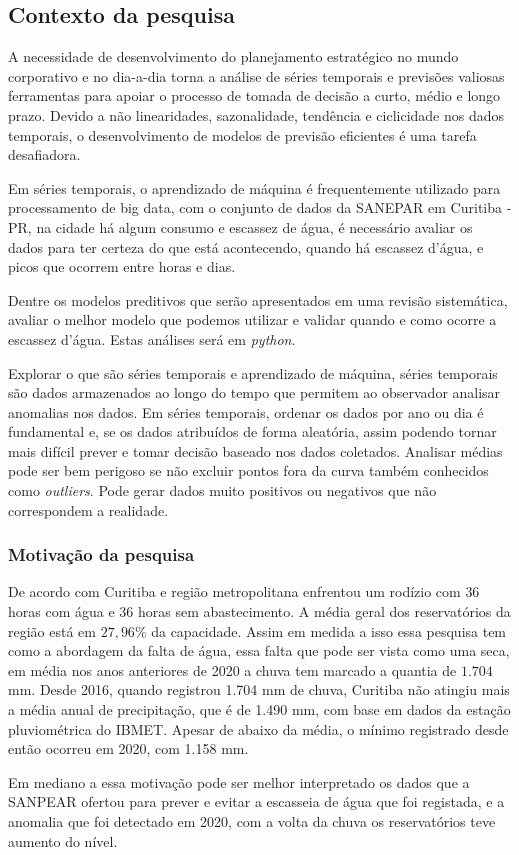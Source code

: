 \subsection{Contexto da pesquisa} \label{subsec:contexto}
 A necessidade de desenvolvimento do planejamento estratégico no mundo corporativo e no dia-a-dia torna a análise de séries temporais e previsões valiosas ferramentas para apoiar o processo de tomada de decisão a curto, médio e longo prazo. Devido a não linearidades, sazonalidade, tendência e ciclicidade nos dados temporais, o desenvolvimento de modelos de previsão eficientes é uma tarefa desafiadora. 

 Em séries temporais, o aprendizado de máquina é frequentemente utilizado para processamento de big data, com o conjunto de dados da SANEPAR em Curitiba - PR, na cidade há algum consumo e escassez de água, é necessário avaliar os dados para ter certeza do que está acontecendo, quando há escassez d'água, e picos que ocorrem entre horas e dias.
 
 Dentre os modelos preditivos que serão apresentados em uma revisão sistemática, avaliar o melhor modelo que podemos utilizar e validar quando e como ocorre a escassez d'água. Estas análises será em \textit{python}.
 
 Explorar o que são séries temporais e aprendizado de máquina, séries temporais são dados armazenados ao longo do tempo que permitem ao observador analisar anomalias nos dados. Em séries temporais, ordenar os dados por ano ou dia é fundamental e, se os dados atribuídos de forma aleatória, assim podendo tornar mais difícil prever e tomar decisão baseado nos dados coletados. 
 Analisar médias pode ser bem perigoso se não excluir pontos fora da curva também conhecidos como \textit{outliers}. Pode gerar dados muito positivos ou negativos que não correspondem a realidade.
   
      
\subsubsection{Motiva\c c\~ao da pesquisa} \label{subsubsec:motivacao}
    
    De acordo com \cite{vasconcelos_2020} Curitiba e região metropolitana enfrentou um rodízio com $36$ horas com água e $36$ horas sem abastecimento. A média geral dos reservatórios da região está em $27,96\%$ da capacidade. Assim em medida a isso essa pesquisa tem como a abordagem da falta de água, essa falta que pode ser vista como uma seca, em média nos anos anteriores de 2020 a chuva tem marcado a quantia de $1.704$ mm. \cite{vasconcelos_2020} Desde 2016, quando registrou 1.704 mm de chuva, Curitiba não atingiu mais a média anual de precipitação, que é de 1.490 mm, com base em dados da estação pluviométrica do IBMET.  Apesar de abaixo da média, o mínimo registrado desde então ocorreu em 2020, com 1.158 mm.
    
    Em mediano a essa motivação pode ser melhor interpretado os dados que a SANPEAR ofertou para prever e evitar a escasseia de água que foi registada, e a anomalia que foi detectado em 2020, com a volta da chuva os reservatórios teve aumento do nível.
    